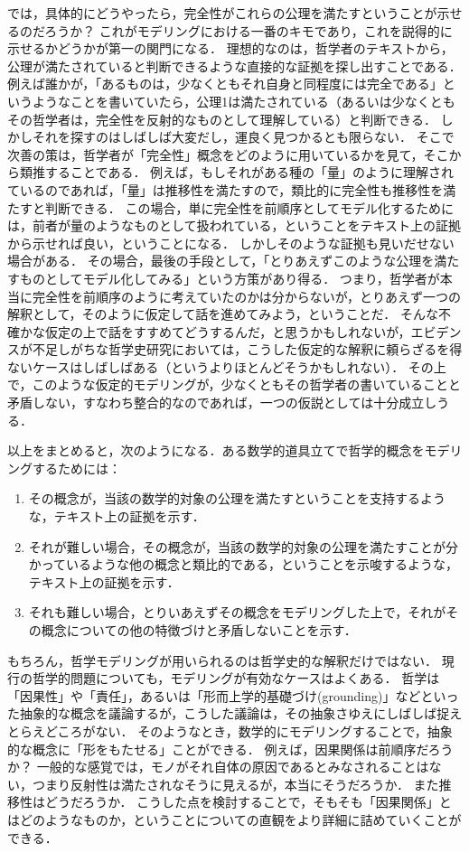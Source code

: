 \documentclass[11pt,a4paper]{jsarticle}
\begin{document}
では，具体的にどうやったら，完全性がこれらの公理を満たすということが示せるのだろうか？
これがモデリングにおける一番のキモであり，これを説得的に示せるかどうかが第一の関門になる．
理想的なのは，哲学者のテキストから，公理が満たされていると判断できるような直接的な証拠を探し出すことである．
例えば誰かが，「あるものは，少なくともそれ自身と同程度には完全である」というようなことを書いていたら，公理1は満たされている（あるいは少なくともその哲学者は，完全性を反射的なものとして理解している）と判断できる．
しかしそれを探すのはしばしば大変だし，運良く見つかるとも限らない．
そこで次善の策は，哲学者が「完全性」概念をどのように用いているかを見て，そこから類推することである．
例えば，もしそれがある種の「量」のように理解されているのであれば，「量」は推移性を満たすので，類比的に完全性も推移性を満たすと判断できる．
この場合，単に完全性を前順序としてモデル化するためには，前者が量のようなものとして扱われている，ということをテキスト上の証拠から示せれば良い，ということになる．
しかしそのような証拠も見いだせない場合がある．
その場合，最後の手段として，「とりあえずこのような公理を満たすものとしてモデル化してみる」という方策があり得る．
つまり，哲学者が本当に完全性を前順序のように考えていたのかは分からないが，とりあえず一つの解釈として，そのように仮定して話を進めてみよう，ということだ．
そんな不確かな仮定の上で話をすすめてどうするんだ，と思うかもしれないが，エビデンスが不足しがちな哲学史研究においては，こうした仮定的な解釈に頼らざるを得ないケースはしばしばある（というよりほとんどそうかもしれない）．
その上で，このような仮定的モデリングが，少なくともその哲学者の書いていることと矛盾しない，すなわち整合的なのであれば，一つの仮説としては十分成立しうる．

以上をまとめると，次のようになる．ある数学的道具立てで哲学的概念をモデリングするためには：
\begin{enumerate}
 \item その概念が，当該の数学的対象の公理を満たすということを支持するような，テキスト上の証拠を示す．
 \item それが難しい場合，その概念が，当該の数学的対象の公理を満たすことが分かっているような他の概念と類比的である，ということを示唆するような，テキスト上の証拠を示す．
 \item それも難しい場合，とりいあえずその概念をモデリングした上で，それがその概念についての他の特徴づけと矛盾しないことを示す．
\end{enumerate}

もちろん，哲学モデリングが用いられるのは哲学史的な解釈だけではない．
現行の哲学的問題についても，モデリングが有効なケースはよくある．
哲学は「因果性」や「責任」，あるいは「形而上学的基礎づけ(grounding)」などといった抽象的な概念を議論するが，こうした議論は，その抽象さゆえにしばしば捉えとらえどころがない．
そのようなとき，数学的にモデリングすることで，抽象的な概念に「形をもたせる」ことができる．
例えば，因果関係は前順序だろうか？
一般的な感覚では，モノがそれ自体の原因であるとみなされることはない，つまり反射性は満たされなそうに見えるが，本当にそうだろうか．
また推移性はどうだろうか．
こうした点を検討することで，そもそも「因果関係」とはどのようなものか，ということについての直観をより詳細に詰めていくことができる．
\end{document}
